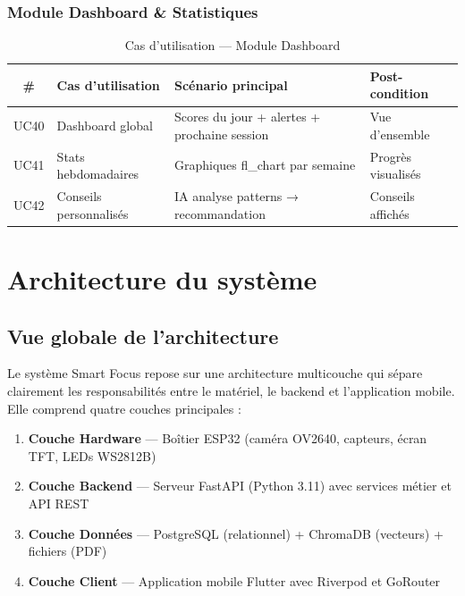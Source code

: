 \documentclass[12pt,a4paper]{report}
\begin{document}
\subsubsection{Module Dashboard \& Statistiques}

\begin{table}[H]
    \centering
    \caption{Cas d'utilisation — Module Dashboard}
    \renewcommand{\arraystretch}{1.3}
    \begin{tabular}{|c|p{3.5cm}|p{4.5cm}|p{3.5cm}|}
        \hline
        \textbf{\#} & \textbf{Cas d'utilisation} & \textbf{Scénario principal} & \textbf{Post-condition} \\
        \hline
        UC40 & Dashboard global & Scores du jour + alertes + prochaine session & Vue d'ensemble \\
        \hline
        UC41 & Stats hebdomadaires & Graphiques fl\_chart par semaine & Progrès visualisés \\
        \hline
        UC42 & Conseils personnalisés & IA analyse patterns → recommandation & Conseils affichés \\
        \hline
    \end{tabular}
\end{table}

\section{Architecture du système}

\subsection{Vue globale de l'architecture}

Le système Smart Focus repose sur une architecture multicouche qui sépare clairement les responsabilités entre le matériel, le backend et l'application mobile. Elle comprend quatre couches principales :

\begin{enumerate}
    \item \textbf{Couche Hardware} — Boîtier ESP32 (caméra OV2640, capteurs, écran TFT, LEDs WS2812B)
    \item \textbf{Couche Backend} — Serveur FastAPI (Python 3.11) avec services métier et \ac{API} REST
    \item \textbf{Couche Données} — PostgreSQL (relationnel) + ChromaDB (vecteurs) + fichiers (PDF)
    \item \textbf{Couche Client} — Application mobile Flutter avec Riverpod et GoRouter
\end{enumerate}
\end{document}

